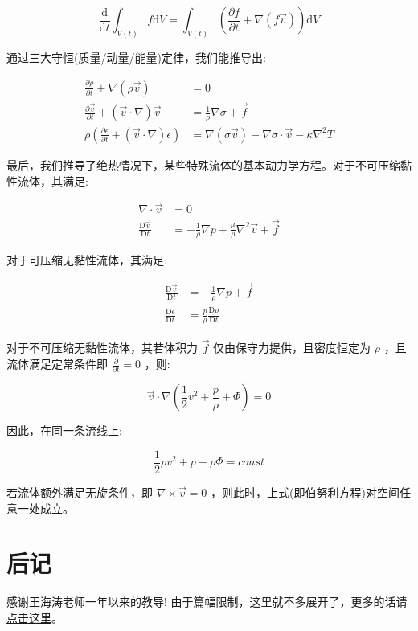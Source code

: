\documentclass[fontset=windows]{article}
\begin{document}
$$
\frac{\mathrm{d}}{\mathrm{d}t} \int_{V(t)} f \mathrm{d}V
= \int_{V(t)} (\frac{\partial f}{\partial t} + \nabla (f \vec{v})) \mathrm{d}V
$$

通过三大守恒(质量/动量/能量)定律，我们能推导出:

$$
\begin{aligned}
    \frac{\partial \rho}{\partial t} + \nabla (\rho \vec{v}) &= 0 \\
    \frac{\partial \vec{v}}{\partial t} + (\vec{v} \cdot \nabla) \vec{v} &= \frac{1}{\rho} \nabla {\sigma} + \vec{f} \\
    \rho(\frac{\partial \epsilon}{\partial t} + (\vec{v} \cdot \nabla) \epsilon) &= \nabla (\sigma \vec {v}) - \nabla{\sigma} \cdot \vec{v} - \kappa \nabla^2{T}
\end{aligned}
$$

最后，我们推导了绝热情况下，某些特殊流体的基本动力学方程。对于不可压缩黏性流体，其满足:

$$
\begin{aligned}
    \nabla \cdot \vec{v} &= 0 \\
    \frac{\mathrm{D} \vec{v}}{\mathrm{D}t} &= -\frac{1}{\rho}\nabla{p} + \frac{\mu}{\rho}\nabla^2{\vec{v}} + \vec{f}
\end{aligned}
$$

对于可压缩无黏性流体，其满足:

$$
\begin{aligned}
    \frac{\mathrm{D} \vec{v}}{\mathrm{D}t} &= - \frac{1}{\rho} \nabla {p} + \vec{f} \\
    \frac{\mathrm{D}\epsilon}{\mathrm{D}t} &= \frac{p}{\rho} \frac{\mathrm{D}\rho}{\mathrm{D}t}
\end{aligned}
$$

对于不可压缩无黏性流体，其若体积力 $\vec{f}$ 仅由保守力提供，且密度恒定为 $\rho$ ，且流体满足定常条件即 $\frac{\partial}{\partial t} = 0$ ，则:

$$
\vec{v} \cdot \nabla(\frac{1}{2} v^2 + \frac{p}{\rho} + \Phi) = 0
$$

因此，在同一条流线上:

$$
\frac{1}{2} \rho v^2 + p + \rho\Phi = const
$$

若流体额外满足无旋条件，即 $\nabla \times \vec{v} = 0$ ，则此时，上式(即伯努利方程)对空间任意一处成立。

\section{后记}

感谢王海涛老师一年以来的教导! 由于篇幅限制，这里就不多展开了，更多的话请\href{https://darksharpness.github.io/haitallica/}{点击这里}。
\end{document}

